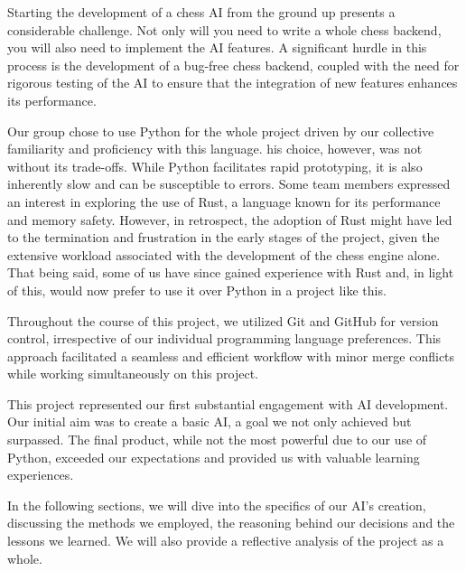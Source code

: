 Starting the development of a chess AI from the ground up presents a considerable challenge.
Not only will you need to write a whole chess backend, you will also
need to implement the AI features. A significant hurdle in this process is the development of a bug-free chess backend, coupled with the need for rigorous testing of the AI to ensure that the integration of new features enhances its performance.

Our group chose to use Python for the whole project driven by our collective familiarity and proficiency with this language. 
his choice, however, was not without its trade-offs. While Python facilitates rapid prototyping, it is also inherently slow and can be susceptible to errors.
Some team members expressed an interest in exploring the use of Rust, a language known for its performance and memory safety. However, in retrospect, the adoption of Rust \cite{je2020scientists} might have led to the termination and frustration in the early stages of the project, given the extensive workload associated with the development of the chess engine alone. That being said, some of us have since gained experience with Rust and, in light of this, would now prefer to use it over Python in a project like this.

Throughout the course of this project, we utilized Git and GitHub for version control, irrespective of our individual programming language preferences. This approach facilitated a seamless and efficient workflow with minor merge conflicts while working simultaneously on this project.

This project represented our first substantial engagement with AI development. Our initial aim was to create a basic AI, a goal we not only achieved but surpassed. The final product, while not the most powerful due to our use of Python, exceeded our expectations and provided us with valuable learning experiences.

In the following sections, we will dive into the specifics of our AI's creation, discussing the methods we employed, the reasoning behind our decisions and the lessons we learned. We will also provide a reflective analysis of the project as a whole.
